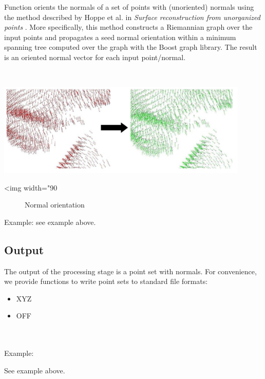 Function  orients the normals of a set of points with (unoriented) normals using the method described by Hoppe et al. in {\em Surface reconstruction from unorganized points} \cite{cgal:hddms-srup-92}. More specifically, this method constructs a Riemannian graph over the input points and propagates a seed normal orientation within a minimum spanning tree computed over the graph with the Boost graph library. The result is an oriented normal vector for each input point/normal.

  \\

\begin{center}
    \label{Point_set_processing_3-fig-mst_normal_orientation}
    \begin{ccTexOnly}
        \includegraphics[width=0.9\textwidth]{Point_set_processing_3/mst_normal_orientation} %
    \end{ccTexOnly}
    \begin{ccHtmlOnly}
        <img width="90%
    \end{ccHtmlOnly}
    \begin{figure}[h]
        \caption{Normal orientation}
    \end{figure}
\end{center}

Example: see  example above.

\subsection{Output}

The output of the processing stage is a point set with normals. For convenience, we provide functions to write point sets to standard file formats:
\begin{itemize}
\item XYZ
\item OFF
\end{itemize}

  \\
  \\

Example:

See  example above.

